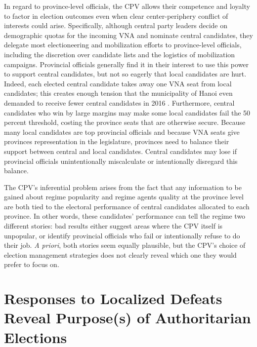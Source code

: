 \documentclass[12pt]{article}
\newcommand{\1}{\mathbbm{1}}
\begin{document}
In regard to province-level officials, the CPV allows their competence and loyalty to factor in election outcomes even when clear center-periphery conflict of interests could arise. Specifically, although central party leaders decide on demographic quotas for the incoming VNA and nominate central candidates, they delegate most electioneering and mobilization efforts to province-level officials, including the discretion over candidate lists and the logistics of mobilization campaigns. Provincial officials generally find it in their interest to use this power to support central candidates, but not so eagerly that local candidates are hurt. Indeed, each elected central candidate takes away one VNA seat from local candidates; this creates enough tension that the municipality of Hanoi even demanded to receive fewer central candidates in 2016 \citep{vnexpress2016_2}. Furthermore, central candidates who win by large margins may make some local candidates fail the 50 percent threshold, costing the province seats that are otherwise secure. Because many local candidates are top provincial officials and because VNA seats give provinces representation in the legislature, provinces need to balance their support between central and local candidates. Central candidates may lose if provincial officials unintentionally miscalculate or intentionally disregard this balance.

The CPV's inferential problem arises from the fact that any information to be gained about regime popularity and regime agents quality at the province level are both tied to the electoral performance of central candidates allocated to each province. In other words, these candidates' performance can tell the regime two different stories: bad results either suggest areas where the CPV itself is unpopular, or identify provincial officials who fail or intentionally refuse to do their job. \textit{A priori}, both stories seem equally plausible, but the CPV's choice of election management strategies does not clearly reveal which one they would prefer to focus on.

\section{Responses to Localized Defeats Reveal Purpose(s) of Authoritarian Elections}
\label{sec:theory_local_defeat}
\end{document}
